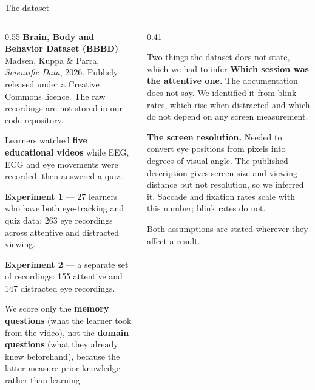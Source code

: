\documentclass[aspectratio=169,10pt]{beamer}
\makeatletter
\newcommand{\sidenote}[1]{{\scriptsize\color{mubeamer@gray7}\sloppy\par#1\par}}
\makeatother
\begin{document}
\begin{frame}{The dataset}
  \begin{columns}[T]
    \begin{column}{0.55\textwidth}
      \small
      \textbf{Brain, Body and Behavior Dataset (BBBD)} \\
      Madsen, Kuppa \& Parra, \emph{Scientific Data}, 2026. Publicly released
      under a Creative Commons licence. The raw recordings are not stored in
      our code repository.

      \vspace{0.5em}
      Learners watched \textbf{five educational videos} while EEG, ECG and
      eye movements were recorded, then answered a quiz.

      \vspace{0.5em}
      \textbf{Experiment 1} --- 27 learners who have both eye-tracking and
      quiz data; 263 eye recordings across attentive and distracted viewing.

      \textbf{Experiment 2} --- a separate set of recordings: 155 attentive
      and 147 distracted eye recordings.

      \vspace{0.5em}
      We score only the \textbf{memory questions} (what the learner took from
      the video), not the \textbf{domain questions} (what they already knew
      beforehand), because the latter measure prior knowledge rather than
      learning.
    \end{column}
    \begin{column}{0.41\textwidth}
      \begin{block}{Two things the dataset does not state, which we had to infer}
        \small
        \textbf{Which session was the attentive one.} The documentation does
        not say. We identified it from blink rates, which rise when distracted
        and which do not depend on any screen measurement.

        \vspace{0.4em}
        \textbf{The screen resolution.} Needed to convert eye positions from
        pixels into degrees of visual angle. The published description gives
        screen size and viewing distance but not resolution, so we inferred
        it. Saccade and fixation rates scale with this number; blink rates do
        not.
      \end{block}
      \sidenote{Both assumptions are stated wherever they affect a result.}
    \end{column}
  \end{columns}
\end{frame}
\end{document}
